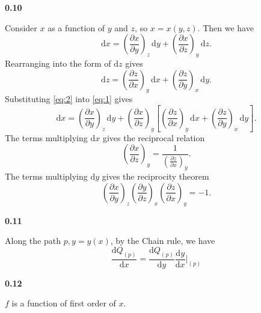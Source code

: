 \documentclass[12pt]{article}
\newcommand{\problem}[2]{%
    \par\vspace{1em}
    \noindent\textbf{#1\quad #2}
    \par\smallskip
}
\begin{document}
\problem{0.10}{}
Consider $x$ as a function of $y$ and $z$, so $x = x(y,z)$. Then we have
\begin{equation}
    \mathrm{d}x = \left(\frac{\partial x}{\partial y}\right)_z \, \mathrm{d}y + \left(\frac{\partial x}{\partial z}\right)_y \, \mathrm{d}z.
    \label{eq:1}
\end{equation}
Rearranging into the form of $\mathrm{d}z$ gives
\begin{equation}
    \mathrm{d}z = \left( \frac{\partial z}{\partial x}\right)_y \, \mathrm{d}x + \left( \frac{\partial z}{\partial y}\right)_x \, \mathrm{d}y.
    \label{eq:2}
\end{equation}
Substituting \eqref{eq:2} into \eqref{eq:1} gives
\begin{equation}
    \mathrm{d}x = \left(\frac{\partial x}{\partial y}\right)_z \, \mathrm{d}y + \left(\frac{\partial x}{\partial z}\right)_y \left[ \left( \frac{\partial z}{       \partial x}\right)_y \, \mathrm{d}x + \left( \frac{\partial z}{\partial y}\right)_x \, \mathrm{d}y \right].    
\end{equation}
The terms multiplying $\mathrm{d}x$ gives the reciprocal relation
\begin{equation}
    \left( \frac{\partial x}{\partial z}\right)_y = \frac{1}{\left( \frac{\partial z}{\partial x}\right)_y}.
\end{equation}
The terms multiplying $\mathrm{d}y$ gives the reciprocity theorem
\begin{equation}
    \left(\frac{\partial x}{\partial y}\right)_z \left( \frac{\partial y}{\partial z}\right)_x \left( \frac{\partial z}{\partial x}\right)_y = -1.
\end{equation}


\problem{0.11}{}
Along the path $p, y = y(x)$, by the Chain rule, we have
\begin{equation}
    \frac{\mathrm{d}Q_{(p)}}{\mathrm{d}{x}} = \frac{\mathrm{d}Q_{(p)}}{\mathrm{d}{y}} \frac{\mathrm{d}y}{\mathrm{d}x} \bigg|_{(p)}
\end{equation}



\problem{0.12}{}
$f$ is a function of first order of $x$.


\pagebreak
\end{document}
